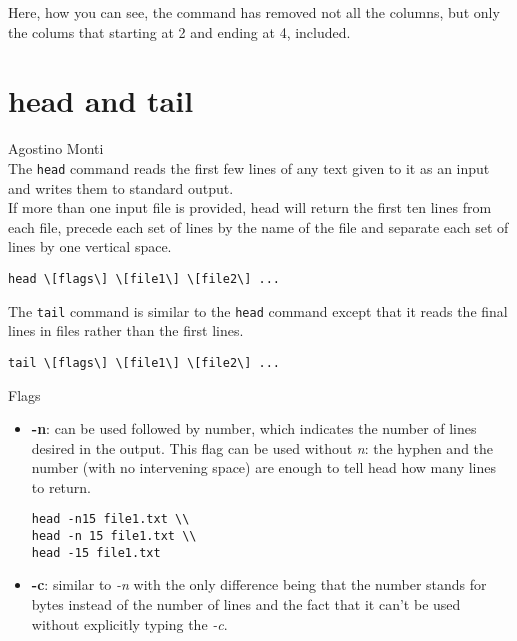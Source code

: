\documentclass[hidelinks,12pt,a4paper,numbers=enddot]{scrartcl}
\begin{document}
Here, how you can see, the command has removed not all the columns, but only the colums that
starting at 2 and ending at 4, included.

\section{head and tail}


\large Agostino Monti \normalsize\\



The \texttt{head} command reads the first few lines of any text given to it as an input
and writes them to standard output.\\
If more than one input file is provided, head will return the first ten lines
from each file, precede each set of lines by the name of the file and separate
each set of lines by one vertical space.

\begin{verbatim}
head \[flags\] \[file1\] \[file2\] ...
\end{verbatim}

The \texttt{tail} command is similar to the \texttt{head} command
except that it reads the final lines in files rather than the first lines.

\begin{verbatim}
tail \[flags\] \[file1\] \[file2\] ...
\end{verbatim}

Flags

\begin{itemize}
    \item \textbf{-n}: can be used followed by number, which indicates the number of
        lines desired in the output. This flag can be used without \emph{n}: the hyphen and the
        number (with no intervening space) are enough to tell head how many lines to return.
\begin{verbatim}
head -n15 file1.txt \\
head -n 15 file1.txt \\
head -15 file1.txt\end{verbatim}
    
    \item \textbf{-c}: similar to \emph{-n} with the only difference being that the number stands for
        bytes instead of the number of lines and the fact that it can't be used without explicitly
        typing the \emph{-c}.
    
\end{itemize}
\end{document}
